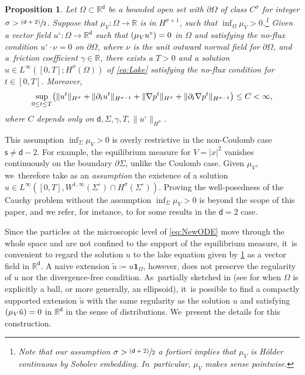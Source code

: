 \documentclass[10pt]{amsart}
\newcommand{\psfrac}[2]{\sfrac{(#1)}{#2}}
\newcommand{\Sigmacirc}{\Sigma^\circ}
\theoremstyle{plain}
\newtheorem{prop}[thm]{Proposition}
\theoremstyle{definition}
\DeclarePairedDelimiter{\pa}{\lparen}{\rparen}
\let\div\relax
\DeclareMathOperator{\div}{\mathrm{div}}
\newcommand{\R}{{\mathbb{R}}}
\let\ga\gamma
\let\Om\Omega
\let\p\partial
\let\tl\tilde
\newcommand{\indic}{\mathbf{1}}
\renewcommand{\d}{\mathsf{d}}
\newcommand{\s}{\mathsf{s}}
\begin{document}
\begin{prop}\label{prop:LakeWP}
Let $\Omega\subset\R^\d$ be a bounded open set with $\p\Om$ of class $C^{\sigma}$ for integer $\sigma>\psfrac{\d+2}{2}$. Suppose that $\mu_V: \Om\to\R$ is in $H^{\sigma+1}$, such that $\inf_{\Om}\mu_V > 0$.\footnote{Note that our assumption $\sigma>\psfrac{\d+2}{2}$ a fortiori implies that $\mu_V$ is Hölder continuous by Sobolev embedding. In~particular, $\mu_V$ makes sense pointwise.} Given a vector field $u^\circ:\Om\to\R^\d$ such that $\div(\mu_V u^\circ) =0$ in $\Omega$ and satisfying the no-flux condition $u^\circ\cdot\nu=0$ on $\p\Om$, where $\nu$ is the unit outward normal field for $\p\Om$, and a~friction coefficient $\ga\in\R$, there exists a $T>0$ and a solution $u\in L^\infty([0,T]; H^\sigma(\Om))$ of \eqref{eq:Lake} satisfying the no-flux condition for $t\in[0,T]$. Moreover,\vspace*{-3pt}
\begin{equation*}
\sup_{0\leq t\leq T} \pa*{\|u^t\|_{H^\sigma} + \|\p_t u^t\|_{H^{\sigma-1}} + \|\nabla p^t\|_{H^\sigma} + \|\p_t\nabla p^t\|_{H^{\sigma-1}}} \leq C<\infty,
\end{equation*}
where $C$ depends only on $\d,\Sigma,\ga,T,\|u^\circ\|_{H^\sigma}$.
\end{prop}

This assumption $\inf_{\Sigma} \mu_V >0$ is overly restrictive in the non-Coulomb case $\s\neq\d-2$. For example, the equilibrium measure for $V=|x|^2$ vanishes continuously on the boundary $\p\Sigma$, unlike the Coulomb case. Given $\mu_V$, we~therefore take as an \emph{assumption} the existence of a solution $u\in L^\infty([0,T], W^{1,\infty}(\Sigmacirc) \cap H^\sigma(\Sigmacirc))$. Proving the well-posedness of the Cauchy problem without the assumption $\inf_{\Sigma} \mu_V >0$ is beyond the scope of this paper, and we refer, for instance, to \cite{BM2006, aTL2023} for some results in the $\d=2$ case.

Since the particles at the microscopic level of \eqref{eq:NewODE} move through the whole space and are not confined to the support of the equilibrium measure, it~is convenient to regard the solution $u$ to the lake equation given by \cref{prop:LakeWP} as a vector field in $\R^\d$. A naive extension $\tl u \coloneqq u\indic_{\Omega}$, however, does not preserve the regularity of $u$ nor the divergence-free condition. As~partially sketched in \cite[Rem.\,B.2]{BCGM2015} (see \cite[Lem.\,B.1]{BCGM2015} for when $\Omega$ is explicitly a ball, or more generally, an ellipsoid), it~is possible to find a compactly supported extension $\tl u$ with the same regularity as the solution $u$ and satisfying $\div(\mu_V\tl u)=0$ in $\R^\d$ in the sense of distributions. We~present the details for this construction.
\end{document}
